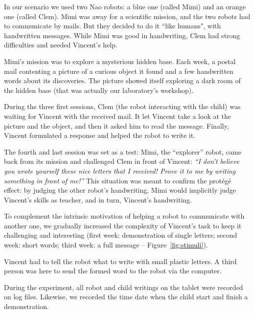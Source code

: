 \documentclass[conference]{IEEEtran}
\begin{document}
In our scenario we used two Nao robots: a blue one 
(called Mimi) and an orange one (called Clem). Mimi was away for a 
scientific mission, and the two robots had to communicate by mails. But they decided to do it 
``like humans", with handwritten messages. While Mimi was good in handwriting, 
Clem had strong difficulties and needed Vincent's help.

Mimi's mission was to explore a mysterious hidden
base. Each week, a postal mail contenting
a picture of a curious object it found and a few handwritten words about its discoveries. 
The picture showed itself exploring 
a dark room of the hidden base (that was actually our laboratory's workshop). 

During the three first sessions, Clem (the robot interacting with the child) was waiting for Vincent
with the received mail. It let Vincent take a look at the picture and the object,
and then it asked him to read the message.
Finally, Vincent formulated a response and helped the robot to write it.

The fourth and last session was set as a test: Mimi, the ``explorer'' robot,
came back from its mission and challenged Clem in
front of Vincent: \emph{``I don't believe you wrote yourself these nice letters that I
received! Prove it to me by writing something in front of me!''} This situation
was meant to confirm the prot\'eg\'e effect: by judging the other robot's
handwriting, Mimi would implicitly judge Vincent's skills as
teacher, and in turn, Vincent's handwriting.

To complement the intrinsic motivation of helping a robot to communicate with another one, we
gradually increased the complexity of Vincent's task to keep it challenging and
interesting (first week: demonstration of single letters; second week:
short words; third week: a full message -- Figure~\ref{fig:stimuli}).
%

Vincent had to tell the robot what to write with small plastic letters. A third person was here to send
the formed word to the robot via the computer.

During the experiment, all robot and child writings on the tablet were recorded on log files. Likewise, we recorded the time date when the child start and finish a demonstration.  

\end{document}

